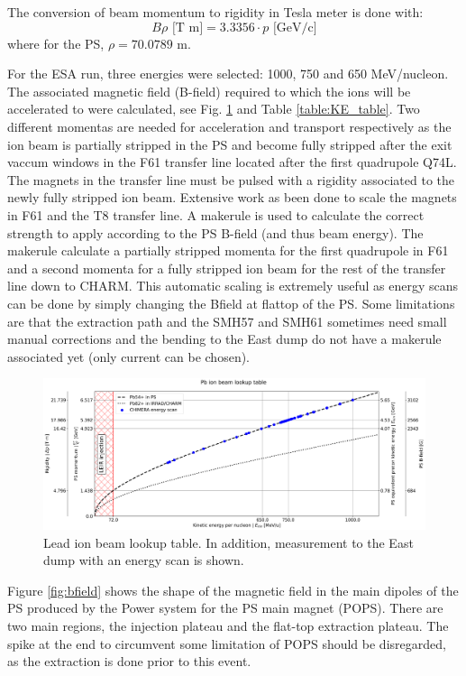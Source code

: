 The conversion of beam momentum to rigidity in Tesla meter is done with: 
$$B\rho \text{ [T m]} = 3.3356\cdot p \text{ [GeV/c]}$$
where for the PS, $\rho = 70.0789$ m.

For the ESA run, three energies were selected: 1000, 750 and 650 MeV/nucleon. The associated magnetic field (B-field) required to which the ions will be accelerated to were calculated, see Fig. \ref{fig:lookup table} and Table \ref{table:KE_table}. Two different momentas are needed for acceleration and transport respectively as the ion beam is partially stripped in the PS and become fully stripped after the exit vaccum windows in the F61 transfer line located after the first quadrupole Q74L. The magnets in the transfer line must be pulsed with a rigidity associated to the newly fully stripped ion beam. Extensive work as been done to scale the magnets in F61 and the T8 transfer line. A makerule is used to calculate the correct strength to apply according to the PS B-field (and thus beam energy). The makerule calculate a partially stripped momenta for the first quadrupole in F61 and a second momenta for a fully stripped ion beam for the rest of the transfer line down to CHARM. This automatic scaling is extremely useful as energy scans can be done by simply changing the Bfield at flattop of the PS. Some limitations are that the extraction path and the SMH57 and SMH61 sometimes need small manual corrections and the bending to the East dump do not have a makerule associated yet (only current can be chosen).

\begin{figure}[!htb]
\centering
\includegraphics[width=1.0\textwidth]{images/kinetic_energy_lookup_chimera.png}
\caption{Lead ion beam lookup table. In addition, measurement to the East dump with an energy scan is shown.}
\label{fig:lookup table}
\end{figure}

Figure \ref{fig:bfield} shows the shape of the magnetic field in the main dipoles of the PS produced by the Power system for the PS main magnet (POPS). There are two main regions, the injection plateau and the flat-top extraction plateau. The spike at the end to circumvent some limitation of POPS should be disregarded, as the extraction is done prior to this event.

